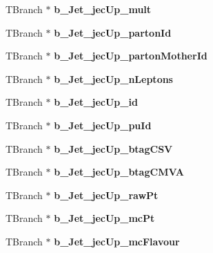 \begin{DoxyCompactItemize}
T\+Branch $\ast$ {\bfseries b\+\_\+\+Jet\+\_\+jec\+Up\+\_\+mult}
\item 
\hypertarget{classMiniTree_a68ba27f2a5cf5faee2a00a0a0181c63b}{}\label{classMiniTree_a68ba27f2a5cf5faee2a00a0a0181c63b} 
T\+Branch $\ast$ {\bfseries b\+\_\+\+Jet\+\_\+jec\+Up\+\_\+parton\+Id}
\item 
\hypertarget{classMiniTree_ac17ffec431ea0301e0cc484023c65692}{}\label{classMiniTree_ac17ffec431ea0301e0cc484023c65692} 
T\+Branch $\ast$ {\bfseries b\+\_\+\+Jet\+\_\+jec\+Up\+\_\+parton\+Mother\+Id}
\item 
\hypertarget{classMiniTree_a43f0031649775e1559298eb43c4b2172}{}\label{classMiniTree_a43f0031649775e1559298eb43c4b2172} 
T\+Branch $\ast$ {\bfseries b\+\_\+\+Jet\+\_\+jec\+Up\+\_\+n\+Leptons}
\item 
\hypertarget{classMiniTree_a4649a0e547264189c4c5ba0b88ae302f}{}\label{classMiniTree_a4649a0e547264189c4c5ba0b88ae302f} 
T\+Branch $\ast$ {\bfseries b\+\_\+\+Jet\+\_\+jec\+Up\+\_\+id}
\item 
\hypertarget{classMiniTree_a21dea754e195f6ed77f99587a00e20cf}{}\label{classMiniTree_a21dea754e195f6ed77f99587a00e20cf} 
T\+Branch $\ast$ {\bfseries b\+\_\+\+Jet\+\_\+jec\+Up\+\_\+pu\+Id}
\item 
\hypertarget{classMiniTree_a531e4154285cb6f2160a56e2b872656a}{}\label{classMiniTree_a531e4154285cb6f2160a56e2b872656a} 
T\+Branch $\ast$ {\bfseries b\+\_\+\+Jet\+\_\+jec\+Up\+\_\+btag\+C\+SV}
\item 
\hypertarget{classMiniTree_aa5ba2373fae7bac87989691c98bc799e}{}\label{classMiniTree_aa5ba2373fae7bac87989691c98bc799e} 
T\+Branch $\ast$ {\bfseries b\+\_\+\+Jet\+\_\+jec\+Up\+\_\+btag\+C\+M\+VA}
\item 
\hypertarget{classMiniTree_a4321943e0c2fdc403e47bf101cfd55b1}{}\label{classMiniTree_a4321943e0c2fdc403e47bf101cfd55b1} 
T\+Branch $\ast$ {\bfseries b\+\_\+\+Jet\+\_\+jec\+Up\+\_\+raw\+Pt}
\item 
\hypertarget{classMiniTree_a7b2146c1023460885da319dfda873a8e}{}\label{classMiniTree_a7b2146c1023460885da319dfda873a8e} 
T\+Branch $\ast$ {\bfseries b\+\_\+\+Jet\+\_\+jec\+Up\+\_\+mc\+Pt}
\item 
\hypertarget{classMiniTree_a5a58a05ea3cd1c46bb4896bd23b864d9}{}\label{classMiniTree_a5a58a05ea3cd1c46bb4896bd23b864d9} 
T\+Branch $\ast$ {\bfseries b\+\_\+\+Jet\+\_\+jec\+Up\+\_\+mc\+Flavour}
\item 
\hypertarget{classMiniTree_a64a739e6a5193a2203549e8eaf40d338}{}\label{classMiniTree_a64a739e6a5193a2203549e8eaf40d338} 

\end{DoxyCompactItemize}
